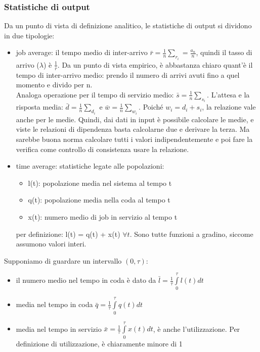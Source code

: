 \documentclass{article}
\begin{document}
\subsubsection{Statistiche di output}
Da un punto di vista di definizione analitico, le statistiche di output si dividono in due tipologie:
\begin{itemize}
\item job average: il tempo medio di inter-arrivo $\bar{r} = \frac{1}{n} \sum\limits_{r_i} = \frac{a_n}{n}$, quindi il tasso di arrivo ($\lambda$) è $\frac{1}{\bar{r}}$. Da un punto di vista empirico, è abbastanza chiaro quant'è il tempo di inter-arrivo medio: prendo il numero di arrivi avuti fino a quel momento e divido per n.\\ Analoga operazione per il tempo di servizio medio: $\bar{s} = \frac{1}{n} \sum\limits_{s_i}$. L'attesa e la risposta media: $\bar{d} = \frac{1}{n} \sum\limits_{d_i}$ e $\bar{w} = \frac{1}{n} \sum\limits_{w_i}$. Poiché $w_i = d_i + s_i$, la relazione vale anche per le medie. Quindi, dai dati in input è possibile calcolare le medie, e viste le relazioni di dipendenza basta calcolarne due e derivare la terza. Ma sarebbe buona norma calcolare tutti i valori indipendentemente e poi fare la verifica come controllo di consistenza usare la relazione.
\item time average: statistiche legate alle popolazioni:
\begin{itemize}
\item l(t): popolazione media nel sistema al tempo t
\item q(t): popolazione media nella coda al tempo t
\item x(t): numero medio di job in servizio al tempo t
\end{itemize}
per definizione: l(t) = q(t) + x(t) $\forall t$. Sono tutte funzioni a gradino, siccome assumono valori interi.
\end{itemize}
Supponiamo di guardare un intervallo $(0, \tau)$:
\begin{itemize}
\item il numero medio nel tempo in coda è dato da $\bar{l} = \frac{1}{\tau} \int\limits_{0}^{\tau} l(t) dt$
\item media nel tempo in coda $\bar{q} = \frac{1}{\tau} \int\limits_{0}^{\tau} q(t) dt$
\item media nel tempo in servizio $\bar{x} = \frac{1}{\tau} \int\limits_{0}^{\tau} x(t) dt$, è anche l'utilizzazione. Per definizione di utilizzazione, è chiaramente minore di 1
\end{itemize}
\end{document}

